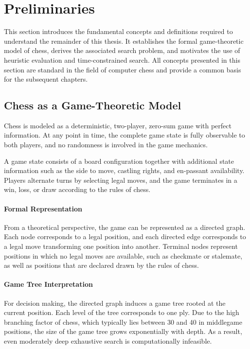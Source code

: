 \section{Preliminaries}
\label{sec:preliminaries}

This section introduces the fundamental concepts and definitions required to
understand the remainder of this thesis. It establishes the formal game-theoretic
model of chess, derives the associated search problem, and motivates the use of
heuristic evaluation and time-constrained search. All concepts presented in this
section are standard in the field of computer chess and provide a common basis
for the subsequent chapters.

\subsection{Chess as a Game-Theoretic Model}

Chess is modeled as a deterministic, two-player, zero-sum game with perfect
information. At any point in time, the complete game state is fully observable
to both players, and no randomness is involved in the game mechanics.

A game state consists of a board configuration together with additional state
information such as the side to move, castling rights, and en-passant
availability. Players alternate turns by selecting legal moves, and the game
terminates in a win, loss, or draw according to the rules of chess.

\paragraph{Formal Representation}
From a theoretical perspective, the game can be represented as a directed graph.
Each node corresponds to a legal position, and each directed edge corresponds to
a legal move transforming one position into another. Terminal nodes represent
positions in which no legal moves are available, such as checkmate or stalemate,
as well as positions that are declared drawn by the rules of chess.

\paragraph{Game Tree Interpretation}
For decision making, the directed graph induces a game tree rooted at the
current position. Each level of the tree corresponds to one ply. Due to the high
branching factor of chess, which typically lies between 30 and 40 in middlegame
positions, the size of the game tree grows exponentially with depth. As a
result, even moderately deep exhaustive search is computationally infeasible.

